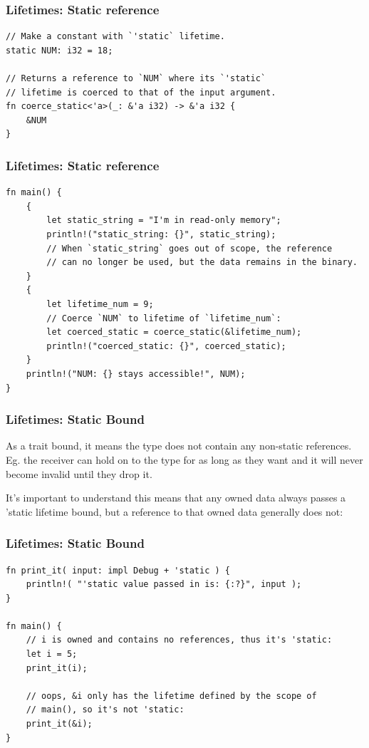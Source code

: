\documentclass[aspectratio=1610,t]{beamer}
\begin{document}

\begin{frame}[fragile]
\frametitle{Lifetimes: Static reference}
\begin{verbatim}
// Make a constant with `'static` lifetime.
static NUM: i32 = 18;

// Returns a reference to `NUM` where its `'static`
// lifetime is coerced to that of the input argument.
fn coerce_static<'a>(_: &'a i32) -> &'a i32 {
    &NUM
}
\end{verbatim}
\end{frame}


\begin{frame}[fragile]
\frametitle{Lifetimes: Static reference}
\begin{verbatim}
fn main() {
    {
        let static_string = "I'm in read-only memory";
        println!("static_string: {}", static_string);
        // When `static_string` goes out of scope, the reference
        // can no longer be used, but the data remains in the binary.
    }
    {
        let lifetime_num = 9;
        // Coerce `NUM` to lifetime of `lifetime_num`:
        let coerced_static = coerce_static(&lifetime_num);
        println!("coerced_static: {}", coerced_static);
    }
    println!("NUM: {} stays accessible!", NUM);
}
\end{verbatim}
\end{frame}


\begin{frame}[fragile]
\frametitle{Lifetimes: Static Bound}
As a trait bound, it means the type does not contain any non-static references. Eg. the receiver can hold on to the type for as long as they want and it will never become invalid until they drop it.

It's important to understand this means that any owned data always passes a 'static lifetime bound, but a reference to that owned data generally does not:
\end{frame}


\begin{frame}[fragile]
\frametitle{Lifetimes: Static Bound}
\begin{verbatim}
fn print_it( input: impl Debug + 'static ) {
    println!( "'static value passed in is: {:?}", input );
}

fn main() {
    // i is owned and contains no references, thus it's 'static:
    let i = 5;
    print_it(i);

    // oops, &i only has the lifetime defined by the scope of
    // main(), so it's not 'static:
    print_it(&i);
}
\end{verbatim}
\end{frame}
\end{document}
